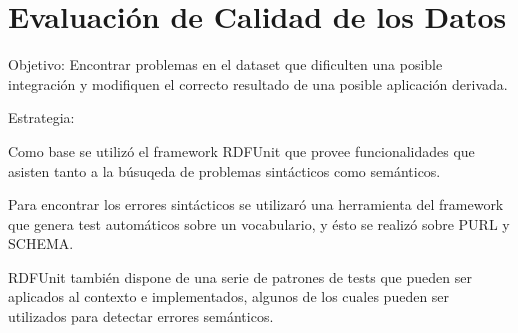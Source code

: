 \chapter{Evaluación de Calidad de los Datos}
\label{chapter:evaluacion}

Objetivo:
Encontrar problemas en el dataset que dificulten una posible integración y modifiquen el correcto resultado de una posible aplicación derivada.

Estrategia:

Como base se utilizó el framework RDFUnit que provee funcionalidades que asisten tanto a la búsuqeda de problemas sintácticos como semánticos.

Para encontrar los errores sintácticos se utilizaró una herramienta del framework que genera test automáticos sobre un vocabulario, y ésto se realizó sobre PURL y SCHEMA.

RDFUnit también dispone de una serie de patrones de tests que pueden ser aplicados al contexto e implementados, algunos de los cuales pueden ser utilizados para detectar errores semánticos. 

